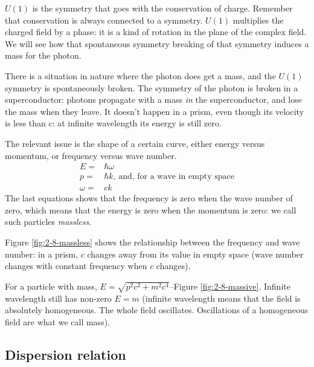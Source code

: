 \documentclass[]{article}
\begin{document}
$U(1)$ is the symmetry that goes with the conservation of charge. Remember that conservation is always connected to a symmetry. $U(1)$ multiplies the charged field by a phase: it is a kind of rotation in the plane of the complex field. We will see how that spontaneous symmetry breaking of that symmetry induces a mass for the photon.

There is a situation in nature where the photon does get a mass, and the $U(1)$ symmetry is spontaneously broken. The symmetry of the photon is broken in a superconductor: photons propagate with a mass \emph{in} the superconductor, and lose the mass when they leave. It doesn't happen in a prism, even though its velocity is less than $c$: at infinite wavelength its energy is still zero.

The relevant issue is the shape of a certain curve, either energy versus momentum, or frequency versus wave number.
\begin{align*}
	E =& \hbar\omega\\
	p =& \hbar k \text{, and, for a wave in empty space}\\
	\omega =& ck
\end{align*}
The last equations shows that the frequency is zero when the wave number of zero, which means that the energy is zero when the momentum is zero: we call such particles \emph{massless}.

Figure \ref{fig:2-8-massless} shows the relationship between the frequency and wave number: in a prism, $c$ changes away from its value in empty space (wave number changes with constant frequency when $c$ changes). 

For a particle with mass, $E=\sqrt{p^2 c^2 + m^2 c^4}$--Figure \ref{fig:2-8-massive}. Infinite wavelength still has non-zero $E=m$ (infinite wavelength means that the field is absolutely homogeneous. The whole field oscillates. Oscillations of a homogeneous field are what we call mass).

\subsection{Dispersion relation}
\end{document}
